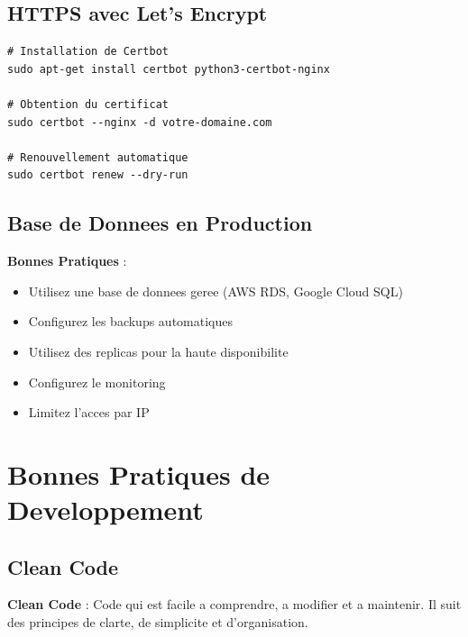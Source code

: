 \documentclass[a4paper,12pt]{book}
\begin{document}
\section{HTTPS avec Let's Encrypt}

\begin{lstlisting}[style=bash]
# Installation de Certbot
sudo apt-get install certbot python3-certbot-nginx

# Obtention du certificat
sudo certbot --nginx -d votre-domaine.com

# Renouvellement automatique
sudo certbot renew --dry-run
\end{lstlisting}

\section{Base de Donnees en Production}

\begin{bestpracticebox}
    \textbf{Bonnes Pratiques} :
    \begin{itemize}
        \item Utilisez une base de donnees geree (AWS RDS, Google Cloud SQL)
        \item Configurez les backups automatiques
        \item Utilisez des replicas pour la haute disponibilite
        \item Configurez le monitoring
        \item Limitez l'acces par IP
    \end{itemize}
\end{bestpracticebox}

\chapter{Bonnes Pratiques de Developpement}

\section{Clean Code}

\begin{definitionbox}
    \textbf{Clean Code} : Code qui est facile a comprendre, a modifier et a maintenir. Il suit des principes de clarte, de simplicite et d'organisation.
\end{definitionbox}
\end{document}
